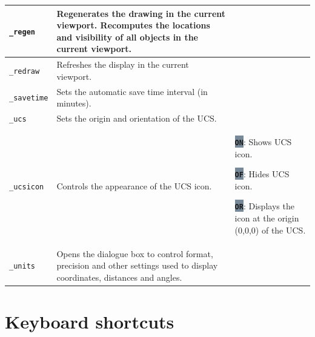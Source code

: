 \documentclass[..]{../IEEEphot}
\newcommand{\param}[1]{\colorbox{LightSlateGray}{\color{Navy}\texttt{\textbf{#1}}}}
\begin{document}
\begin{center}
\begin{longtable}{m{.2\linewidth}m{.33\linewidth}m{.33\linewidth}}
\\
\midrule
\texttt{\_regen} & Regenerates the drawing in the current viewport. Recomputes the locations and visibility of all objects in the current viewport. & 
\\
\midrule
\texttt{\_redraw} & Refreshes the display in the current viewport. & 
\\
\midrule
\texttt{\_savetime} & Sets the automatic save time interval (in minutes). & 
\\
\midrule
\texttt{\_ucs} & Sets the origin and orientation of the UCS. & 
\\
\midrule
\texttt{\_ucsicon} & Controls the appearance of the UCS icon. & 
\param{ON}: Shows UCS icon.

\param{OF}: Hides UCS icon.

\param{OR}: Displays the icon at the origin (0,0,0) of the UCS.
\\
\midrule
\texttt{\_units} & Opens the dialogue box to control format, precision and other settings used to display coordinates, distances and angles.
\\
\bottomrule
\end{longtable}
\end{center}

\clearpage

\section{Keyboard shortcuts}
\end{document}
